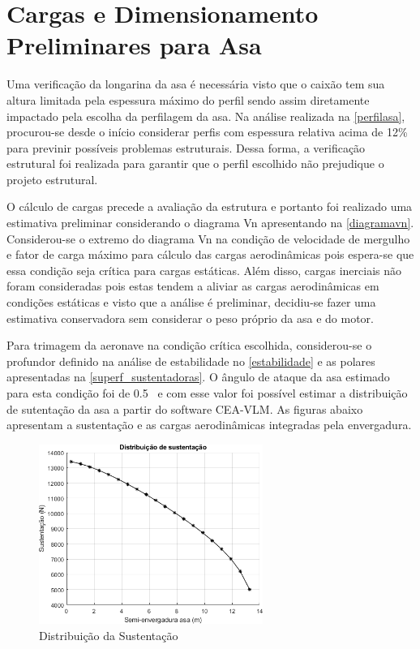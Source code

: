 \chapter{Cargas e Dimensionamento Preliminares para Asa}

Uma verificação da longarina da asa é necessária visto que o caixão tem sua altura limitada pela espessura máximo do perfil sendo assim diretamente impactado pela escolha da perfilagem da asa. Na análise realizada na \autoref{perfilasa}, procurou-se desde o início considerar perfis com espessura relativa acima de 12\% para previnir possíveis problemas estruturais. Dessa forma, a verificação estrutural foi realizada para garantir que o perfil escolhido não prejudique o projeto estrutural.

O cálculo de cargas precede a avaliação da estrutura e portanto foi realizado uma estimativa preliminar considerando o diagrama Vn apresentando na \autoref{diagramavn}. Considerou-se o extremo do diagrama Vn na condição de velocidade de mergulho e fator de carga máximo para cálculo das cargas aerodinâmicas pois espera-se que essa condição seja crítica para cargas estáticas. Além disso, cargas inerciais não foram consideradas pois estas tendem a aliviar as cargas aerodinâmicas em condições estáticas e visto que a análise é preliminar, decidiu-se fazer uma estimativa conservadora sem considerar o peso próprio da asa e do motor.

Para trimagem da aeronave na condição crítica escolhida, considerou-se o profundor definido na análise de estabilidade no \autoref{estabilidade} e as polares apresentadas na \autoref{superf_sustentadoras}. O ângulo de ataque da asa estimado para esta condição foi de 0.5 \textdegree\ e com esse valor foi possível estimar a distribuição de sutentação da asa a partir do software CEA-VLM. As figuras abaixo apresentam a sustentação e as cargas aerodinâmicas integradas pela envergadura.

\begin{figure}[H]
\centering
\includegraphics[width=0.65\textwidth]{images/parte3/loads_lift.png}
\caption{Distribuição da Sustentação}
\label{fig:loads_lift}
\end{figure}


